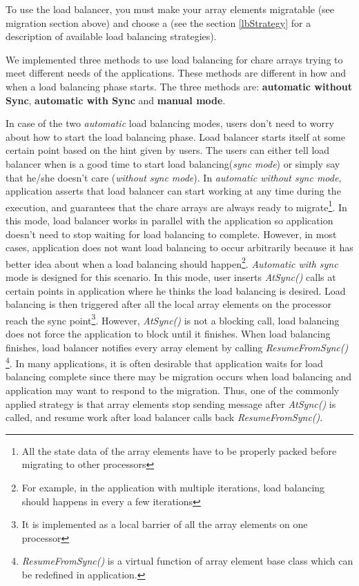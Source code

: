 To use the load balancer, you must make your array elements migratable
(see migration section above) and choose a  
(see the section \ref{lbStrategy} for a description
of available load balancing strategies).

We implemented three methods to use load balancing for chare arrays
trying to meet different needs of the applications. These methods
are different in how and when a load balancing phase starts.
The three methods are: {\bf automatic without Sync}, 
{\bf automatic with Sync} and {\bf manual mode}.

In case of the two {\em automatic} load balancing modes, users don't need 
to worry about how to start the load balancing phase. Load balancer 
starts itself at some certain point based on the hint given by users. 
The users can either tell load balancer when is a good time to start 
load balancing({\em sync mode}) or simply say that he/she doesn't care
({\em without sync mode}). 
In {\em automatic without sync mode}, application asserts
that load balancer can start working at any time during the execution, and
guarantees that the chare arrays are always ready to 
migrate\footnote{All the state data of the array elements have to be 
properly packed before migrating to 
other processors}. In this mode, load balancer works in parallel with 
the application so application doesn't need to stop waiting for load 
balancing to complete. However, in most cases, 
application does not want load balancing to occur arbitrarily because it 
has better idea about when a load balancing should 
happen\footnote{For example, in the application with multiple iterations, 
load balancing should happens in every a few iterations}. 
{\em Automatic with sync} mode is designed for this 
scenario. In this mode, user inserts {\em AtSync()} calls at certain points 
in application where he thinks the load balancing is desired. 
Load balancing is then triggered after all the local array elements on 
the processor reach the sync point\footnote{It is implemented as a local 
barrier of all the array elements on one processor}. 
However, {\em AtSync()} is not a blocking call, 
load balancing does not force the application to block until it  
finishes. When load balancing finishes, load balancer notifies every array
element by calling {\em ResumeFromSync()}
\footnote{{\em ResumeFromSync()} is a virtual function of array element
base class which can be redefined in application.}. In many applications,
it is often desirable that application waits for load balancing complete since
there may be migration occurs when load balancing and application may want to
respond to the migration. Thus, one of the commonly applied strategy is 
that array elements stop sending message after {\em AtSync()} is called, 
and resume work after load balancer calls back {\em ResumeFromSync()}.

